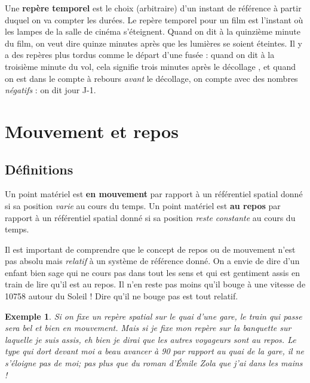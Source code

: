 \documentclass[a4paper,12pt]{book}
\theoremstyle{mes_exemples}	\newtheorem{exemple}[numtho]{Exemple}
\theoremstyle{mes_tho}
\newcommand{\defe}[2]{\textbf{#1}\index{#2}}
\begin{document}
Une \defe{repère temporel}{Repère!temporel} est le choix (arbitraire) d'un instant de référence à partir duquel on va compter les durées. Le repère temporel pour un film est l'instant où les lampes de la salle de cinéma s'éteignent. Quand on dit \og à la quinzième minute du film\fg, on veut dire \og quinze minutes après que les lumières se soient éteintes\fg. Il y a des repères plus tordus comme le départ d'une fusée : quand on dit \og à la troisième minute du vol\fg, cela signifie \og trois minutes après le décollage \fg, et quand on est dans le compte à rebours \emph{avant} le décollage, on compte avec des nombres \emph{négatifs} : on dit \og jour J-1\fg.


\section{Mouvement et repos}

\subsection{Définitions}

Un point matériel est \defe{en mouvement}{Mouvement} par rapport à un référentiel spatial donné si sa position \emph{varie} au cours du temps. Un point matériel est \defe{au repos}{Repos} par rapport à un référentiel spatial donné si sa position \emph{reste constante} au cours du temps.

Il est important de comprendre que le concept de repos ou de mouvement n'est pas \og absolu\fg{} mais \emph{relatif} à un système de référence donné. On a envie de dire d'un enfant bien sage qui ne cours pas dans tout les sens et qui est gentiment assis en train de lire qu'il est au repos. Il n'en reste pas moins qu'il bouge à une vitesse de \unit{10758}{\kilo\meter\per\hour} autour du Soleil ! Dire qu'il ne bouge pas est tout relatif.

\begin{exemple}
Si on fixe un repère spatial sur le quai d'une gare, le train qui passe sera bel et bien en mouvement. Mais si je fixe mon repère sur la banquette sur laquelle je suis assis, eh bien je dirai que les autres voyageurs sont au repos. Le type qui dort devant moi a beau avancer à \unit{90}{\kilo\meter\per\hour}   par rapport au quai de la gare, il ne s'éloigne pas de moi; pas plus que du roman d'Émile Zola que j'ai dans les mains !
\end{exemple}
\end{document}
